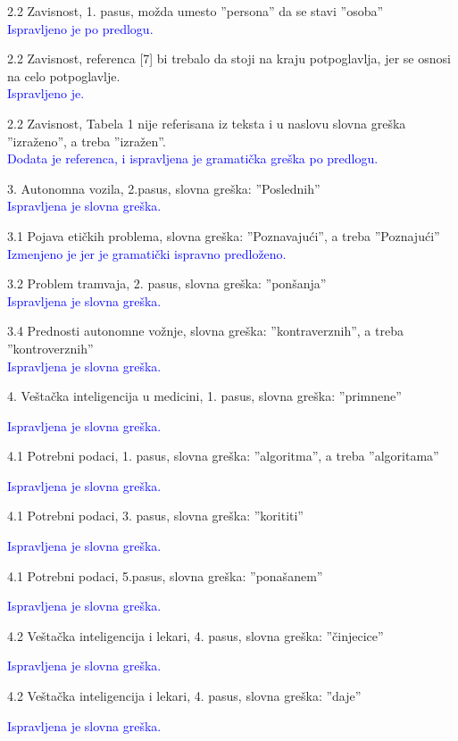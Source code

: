 \documentclass[a4paper]{report}
\newcommand{\odgovor}[1]{\textcolor{blue}{#1}}
\begin{document}
2.2 Zavisnost, 1. pasus, možda umesto ''persona'' da se stavi ''osoba'' \\
\odgovor{Ispravljeno je po predlogu.}

2.2 Zavisnost, referenca [7] bi trebalo da stoji na kraju potpoglavlja, jer se osnosi na celo potpoglavlje. \\
\odgovor{Ispravljeno je.}

2.2 Zavisnost, Tabela 1 nije referisana iz teksta i u naslovu slovna greška ''izraženo'', a treba ''izražen''. \\
\odgovor{Dodata je referenca, i ispravljena je gramatička greška po predlogu.}

3. Autonomna vozila, 2.pasus, slovna greška: ''Poslednih'' \\
\odgovor{Ispravljena je slovna greška.}

3.1 Pojava etičkih problema, slovna greška: ''Poznavajući'', a treba ''Poznajući'' \\
\odgovor{Izmenjeno je jer je gramatički ispravno predloženo.}

3.2 Problem tramvaja, 2. pasus, slovna greška: ''ponšanja'' \\
\odgovor{Ispravljena je slovna greška.}

3.4 Prednosti autonomne vožnje, slovna greška: ''kontraverznih'', a treba ''kontroverznih'' \\
\odgovor{Ispravljena je slovna greška.}

4. Veštačka inteligencija u medicini, 1. pasus, slovna greška: ''primnene''

\odgovor{Ispravljena je slovna greška.}

4.1 Potrebni podaci, 1. pasus, slovna greška: ''algoritma'', a treba ''algoritama''

\odgovor{Ispravljena je slovna greška.}

4.1 Potrebni podaci, 3. pasus, slovna greška: ''korititi''

\odgovor{Ispravljena je slovna greška.}

4.1 Potrebni podaci, 5.pasus, slovna greška: ''ponašanem''

\odgovor{Ispravljena je slovna greška.}

4.2 Veštačka inteligencija i lekari, 4. pasus, slovna greška: ''činjecice''

\odgovor{Ispravljena je slovna greška.}

4.2 Veštačka inteligencija i lekari, 4. pasus, slovna greška: ''daje''

\odgovor{Ispravljena je slovna greška.}
\end{document}
